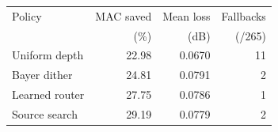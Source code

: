 \begin{tabular}{lrrr}
\toprule
Policy & MAC saved & Mean loss & Fallbacks \\
 & (\%) & (dB) & (/265) \\
\midrule
Uniform depth & 22.98 & 0.0670 & 11 \\
Bayer dither & 24.81 & 0.0791 & 2 \\
Learned router & 27.75 & 0.0786 & 1 \\
Source search & 29.19 & 0.0779 & 2 \\
\bottomrule
\end{tabular}
